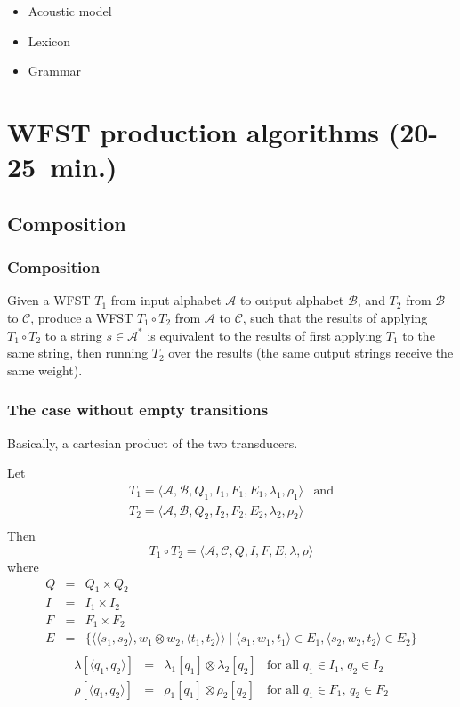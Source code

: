 \documentclass{beamer}
\newcommand{\<}{\langle}
\renewcommand{\>}{\rangle}
\begin{document}
\begin{frame}
  \begin{itemize}
  \item Acoustic model
  \item Lexicon
  \item Grammar
  \end{itemize}
\end{frame}
\section{WFST production algorithms (20-25~min.)}

\subsection{Composition}

\begin{frame}
  \frametitle{Composition}

  Given a WFST $T_1$ from input alphabet $\mathcal{A}$ to output alphabet
  $\mathcal{B}$, and $T_2$ from $\mathcal{B}$ to $\mathcal{C}$, produce a WFST $T_1 \circ
  T_2$ from $\mathcal{A}$ to $\mathcal{C}$, such that the results of applying $T_1
  \circ T_2$ to a string $s \in \mathcal{A}^*$ is equivalent to the results of
  first applying $T_1$ to the same string, then running $T_2$ over the
  results (the same output strings receive the same weight).
\end{frame}

\begin{frame}
  \frametitle{The case without empty transitions}

  Basically, a cartesian product of the two transducers.

  Let 
$$
\begin{array}{ll}
T_1 = \<\mathcal{A}, \mathcal{B}, Q_1, I_1, F_1, E_1, \lambda_1, \rho_1\> &
  \mbox{and} \\
T_2 = \<\mathcal{A}, \mathcal{B}, Q_2, I_2, F_2, E_2, \lambda_2, \rho_2\> \\
\end{array}
$$
Then
$$
T_1 \circ T_2 = \<\mathcal{A}, \mathcal{C}, Q, I, F, E, \lambda, \rho\>
$$
where
$$
\begin{array}{rcll}
  Q & = & Q_1 \times Q_2 \\
  I & = & I_1 \times I_2 \\
  F & = & F_1 \times F_2 \\
  E & = & \{\<\<s_1,s_2\>, w_1 \otimes w_2, \<t_1, t_2\>\> \; | \; \<s_1,w_1,t_1\>
              \in E_1, \<s_2, w_2, t_2\> \in E_2\} \\
\end{array}
$$
$$
\begin{array}{rcll}
  \lambda[\<q_1,q_2\>] & = & \lambda_1[q_1]\otimes\lambda_2[q_2] & \mbox{for
    all $q_1 \in I_1$, $q_2 \in I_2$} \\
  \rho[\<q_1,q_2\>] & = & \rho_1[q_1]\otimes\rho_2[q_2] & \mbox{for
    all $q_1 \in F_1$, $q_2 \in F_2$} \\
\end{array}
$$
\end{frame}
\end{document}
